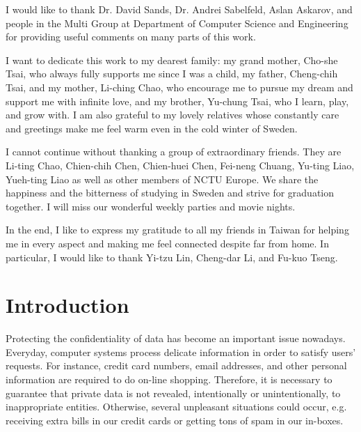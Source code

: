 \documentclass{report}
\begin{document}
I would like to thank Dr. David Sands, Dr. Andrei Sabelfeld, Aslan Askarov, and people in the Multi
Group at Department of Computer Science and Engineering for providing useful comments on many 
parts of this work.

I want to dedicate this work to my dearest family: my grand mother, Cho-she Tsai, who always fully supports
me since I was a child, my father, Cheng-chih Tsai, and my mother, Li-ching Chao, who encourage me
to pursue my dream and support me with infinite love, and my brother, Yu-chung Tsai, who I learn, play, 
and grow with. I am also grateful to my lovely relatives whose constantly care and greetings make me
feel warm even in the cold winter of Sweden.

I cannot continue without thanking a group of extraordinary friends. They are Li-ting Chao, 
Chien-chih Chen, Chien-huei Chen, Fei-neng Chuang, Yu-ting Liao, Yueh-ting Liao as well as
other members of NCTU Europe. We share the happiness and the bitterness of studying in Sweden and
strive for graduation together. I will miss our wonderful weekly parties and movie nights.

In the end, I like to express my gratitude to all my friends in Taiwan for helping me
in every aspect and making me feel connected despite far from home.
In particular, I would like to thank Yi-tzu Lin, Cheng-dar Li, and Fu-kuo Tseng.


\cleardoublepage
\pagestyle{plain}


\chapter{Introduction}
\label{Chap:Introduction}


Protecting the confidentiality of data has become an important 
issue nowadays. Everyday, computer systems process delicate information in
order to satisfy users' requests. For instance, credit card numbers,
email addresses, and other personal information are required to do on-line
shopping.
Therefore, it is necessary to guarantee that private data is not
revealed, intentionally or unintentionally, to inappropriate entities.
Otherwise, several unpleasant situations could occur, 
e.g. receiving extra bills in our credit
cards or getting tons of spam in our in-boxes. 
 
\end{document}
